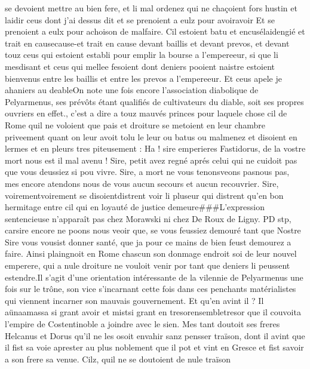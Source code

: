 \documentclass{article}
\begin{document}
\begin{pages}
   se devoient mettre au bien fere, et li mal ordenez qui ne chaçoient fors hustin et laidir ceus dont j’ai dessus 
   dit et se prenoient a eulz pour  
   avoiravoir Et se prenoient a eulx pour
   achoison de malfaire. Cil estoient batu et encusélaidengié et trait en
   causecause-et trait en cause devant baillis et devant prevos,
   et devant touz ceus qui estoient establi pour emplir la bourse a l’empereeur, 
   si que li mesdisant et ceus qui mellee fesoient dont deniers pooient naistre estoient bienvenus 
   entre les baillis et entre les prevos a l’empereeur. 
   Et ceus apele je ahaniers au deableOn note une fois encore l'association
   diabolique de Pelyarmenus, ses prévôts étant qualifiés de cultivateurs du diable, soit ses propres ouvriers en effet., 
   c’est a dire a touz mauvés princes pour laquele chose cil de Rome quil ne voloient 
   que pais et droiture se metoient en leur chambre priveement quant on leur avoit tolu le leur ou batus ou malmenez 
   et disoient en lermes et en pleurs tres piteusement :
   Ha ! sire emperieres Fastidorus, 
   de la vostre mort nous est il mal avenu ! Sire, petit avez regné aprés celui qui ne cuidoit pas 
      que vous deussiez si pou vivre. 
   Sire, a mort ne vous tenonsveons 
      pasnous pas, mes encore atendons nous de vous 
      aucun secours et aucun recouvrier. 
      Sire, voirementvoirement se 
      disoientdistrent voir li pluseur qui 
      distrent qu’en bon hermitage entre cil qui en loyauté de justice demeure###L'expression 
         sentencieuse n'apparaît pas chez Morawski ni chez De Roux de Ligny. PD stp, 
      carsire encore ne poons nous veoir que, se vous feussiez demouré tant que Nostre Sire vous vousist donner santé, 
      que ja pour ce mains de bien feust demourez a faire. \pend 
\pstart Ainsi plaingnoit en Rome chascun son donmage 
   endroit soi de leur nouvel emperere, 
   qui a nule droiture ne vouloit venir por tant que deniers li peussent estendre.Il s'agit 
   d'une orientation intéressante de la vilennie de Pelyarmenus une fois sur le trône, son vice s'incarnant cette fois dans ces penchants
   matérialistes qui viennent incarner son mauvais gouvernement. 
   Et qu’en avint il ? Il 
   aünaamassa si grant avoir et 
   mistsi grant 
   en tresorensembletresor que 
   il couvoita l’empire de 
   Costentinoble a joindre avec le sien. Mes tant doutoit ses freres 
   Helcanus et Dorus qu’il ne les osoit envahir sanz pensser traïson, 
   dont il avint que il fist sa voie aprester au plus noblement que il pot et vint en Gresce 
   et fist savoir a son frere sa venue. Cilz, quil ne se doutoient de nule traïson 

\end{pages}
\end{document}
